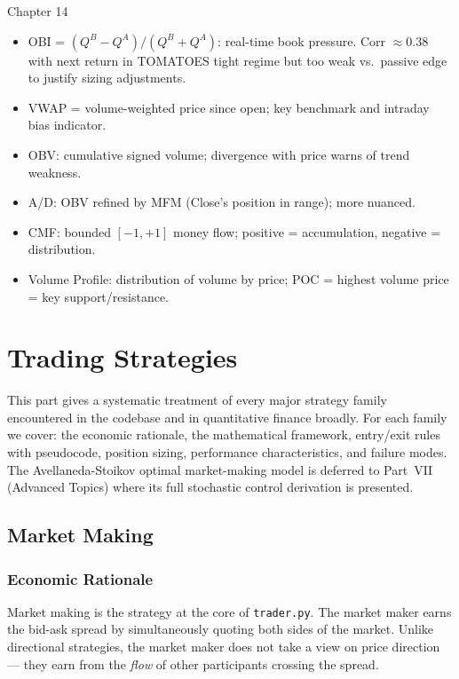 \documentclass[12pt,a4paper,openany]{report}
\theoremstyle{definition}
\begin{document}
\begin{takeawaybox}{Chapter 14}
\begin{itemize}
  \item OBI = $(Q^B - Q^A)/(Q^B + Q^A)$: real-time book pressure. Corr $\approx 0.38$ with next return in TOMATOES tight regime but too weak vs.\ passive edge to justify sizing adjustments.
  \item VWAP = volume-weighted price since open; key benchmark and intraday bias indicator.
  \item OBV: cumulative signed volume; divergence with price warns of trend weakness.
  \item A/D: OBV refined by MFM (Close's position in range); more nuanced.
  \item CMF: bounded $[-1,+1]$ money flow; positive = accumulation, negative = distribution.
  \item Volume Profile: distribution of volume by price; POC = highest volume price = key support/resistance.
\end{itemize}
\end{takeawaybox}


%
%
\part{Trading Strategies}

This part gives a systematic treatment of every major strategy family encountered in the codebase and in quantitative finance broadly. For each family we cover: the economic rationale, the mathematical framework, entry/exit rules with pseudocode, position sizing, performance characteristics, and failure modes. The Avellaneda-Stoikov optimal market-making model is deferred to Part~VII (Advanced Topics) where its full stochastic control derivation is presented.

\chapter{Market Making}

\section{Economic Rationale}

Market making is the strategy at the core of \texttt{trader.py}. The market maker earns the bid-ask spread by simultaneously quoting both sides of the market. Unlike directional strategies, the market maker does not take a view on price direction — they earn from the \emph{flow} of other participants crossing the spread.
\end{document}
